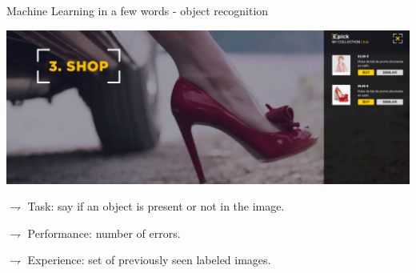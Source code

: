 \documentclass[9pt]{beamer}
\begin{document}
\begin{frame}{Machine Learning in a few words - object recognition}


\begin{center}
\includegraphics[width=.75\textwidth]{watiz_ex.PNG}
\end{center}

\vspace{.2cm}

$\rightharpoondown$   \alert{Task}: say if an object is present or not in the image.

$\rightharpoondown$  \alert{Performance}: number of errors.

$\rightharpoondown$  \alert{Experience}: set of previously seen labeled images.

\end{frame}
\end{document}

